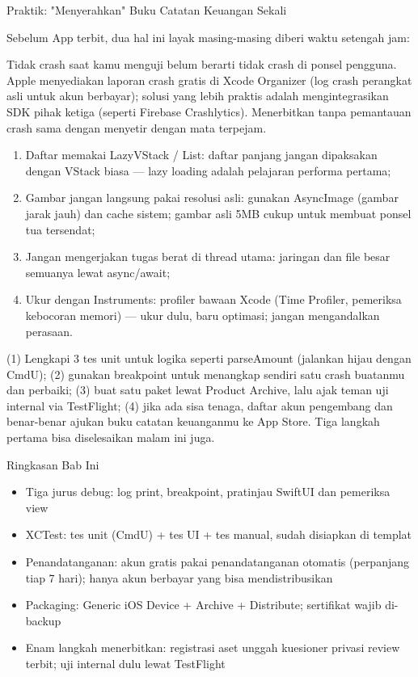 \begin{tcbpractice}{Praktik: "Menyerahkan" Buku Catatan Keuangan Sekali}

Sebelum App terbit, dua hal ini layak masing-masing diberi waktu setengah jam:


Tidak crash saat kamu menguji belum berarti tidak crash di ponsel pengguna. Apple menyediakan laporan crash gratis di Xcode Organizer (log crash perangkat asli untuk akun berbayar); solusi yang lebih praktis adalah mengintegrasikan SDK pihak ketiga (seperti Firebase Crashlytics). Menerbitkan tanpa pemantauan crash sama dengan menyetir dengan mata terpejam.


\begin{enumerate}
  \item Daftar memakai LazyVStack / List: daftar panjang jangan dipaksakan dengan VStack biasa — lazy loading adalah pelajaran performa pertama;
  \item Gambar jangan langsung pakai resolusi asli: gunakan AsyncImage (gambar jarak jauh) dan cache sistem; gambar asli 5MB cukup untuk membuat ponsel tua tersendat;
  \item Jangan mengerjakan tugas berat di thread utama: jaringan dan file besar semuanya lewat async/await;
  \item Ukur dengan Instruments: profiler bawaan Xcode (Time Profiler, pemeriksa kebocoran memori) — ukur dulu, baru optimasi; jangan mengandalkan perasaan.
\end{enumerate}

(1) Lengkapi 3 tes unit untuk logika seperti parseAmount (jalankan hijau dengan CmdU); (2) gunakan breakpoint untuk menangkap sendiri satu crash buatanmu dan perbaiki; (3) buat satu paket lewat Product Archive, lalu ajak teman uji internal via TestFlight; (4) jika ada sisa tenaga, daftar akun pengembang dan benar-benar ajukan buku catatan keuanganmu ke App Store. Tiga langkah pertama bisa diselesaikan malam ini juga.

\end{tcbpractice}

\begin{tcbsummary}{Ringkasan Bab Ini}
\begin{itemize}
  \item Tiga jurus debug: log print, breakpoint, pratinjau SwiftUI dan pemeriksa view
  \item XCTest: tes unit (CmdU) + tes UI + tes manual, sudah disiapkan di templat
  \item Penandatanganan: akun gratis pakai penandatanganan otomatis (perpanjang tiap 7 hari); hanya akun berbayar yang bisa mendistribusikan
  \item Packaging: Generic iOS Device + Archive + Distribute; sertifikat wajib di-backup
  \item Enam langkah menerbitkan: registrasi aset unggah kuesioner privasi review terbit; uji internal dulu lewat TestFlight
\end{itemize}

\end{tcbsummary}
